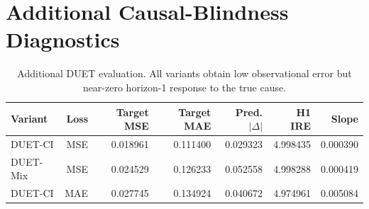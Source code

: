 \documentclass{article}
\begin{document}
\section{Additional Causal-Blindness Diagnostics}
\label{app:sanity}

\begin{table}[htbp]
\centering
\caption{All-history sensitivity evaluation. This diagnostic is useful for
identifying target-history reliance, but all-history additive shifts can interact
with model-internal normalization.}
\label{tab:app_sensitivity}
\end{table}

\begin{table}[htbp]
\centering
\caption{Additional DUET evaluation. All variants obtain low observational error
but near-zero horizon-1 response to the true cause.}
\label{tab:app_duet}
\begin{tabular}{lrrrrrr}
\toprule
Variant & Loss & Target MSE & Target MAE & Pred. $|\Delta|$ & H1 IRE & Slope \\
\midrule
DUET-CI  & MSE & 0.018961 & 0.111400 & 0.029323 & 4.998435 & 0.000390 \\
DUET-Mix & MSE & 0.024529 & 0.126233 & 0.052558 & 4.998288 & 0.000419 \\
DUET-CI  & MAE & 0.027745 & 0.134924 & 0.040672 & 4.974961 & 0.005084 \\
\bottomrule
\end{tabular}
\end{table}
\end{document}
